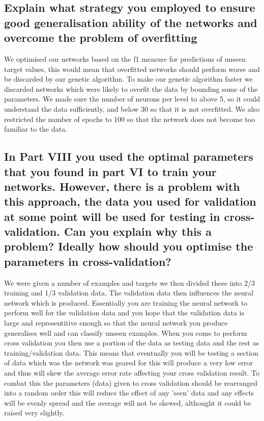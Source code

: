 \documentclass[11pt]{article}
\begin{document}

\subsection{Explain what strategy you employed to ensure good generalisation ability of the networks and overcome the problem of overfitting}

We optimised our networks based on the f1 measure for predictions of unseen target values, this would mean that overfitted networks should perform worse and be discarded by our genetic algorithm. To make our genetic algorithm faster we discarded networks which were likely to overfit the data by bounding some of the parameters. We made sure the number of neurons per level to above 5, so it could understand the data sufficiently, and below 30 so that it is not overfitted. We also restricted the number of epochs to 100 so that the network does not become too familiar to the data. 

\subsection{In Part VIII you used the optimal parameters that you found in part VI to train your networks. However, there is a problem with this approach, the data you used for validation at some point will be used for testing in cross-validation. Can you explain why this a problem? Ideally how should you optimise the parameters in cross-validation?}

We were given a number of examples and targets we then divided these into  2/3 training and 1/3 validation data. The validation data then influences the neural network which is produced. Essentially you are training the neural network to perform well for the validation data and you hope that the validation data is large and representitive enough so that the neural network you produce generalises well and can classify unseen examples. When you come to perform cross validation you then use a portion of the data as testing data and the rest as training/validation data. This means that eventually you will be testing a section of data which was the network was geared for this will produce a very low error and thus will skew the average error rate affecting your cross validation result. To combat this the parameters (data) given to cross validation should be rearranged into a random order this will reduce the effect of any 'seen' data and any effects will be evenly spread and the average will not be skewed, althought it could be raised very slightly.
\end{document}
